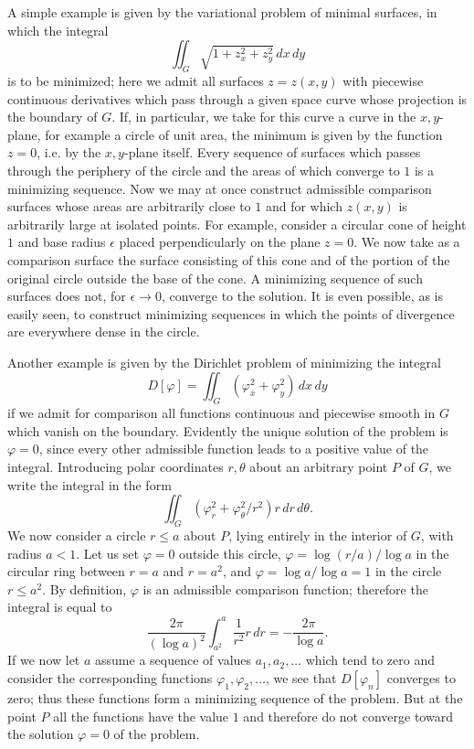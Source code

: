 A simple example is given by the variational problem of minimal surfaces, in which the integral
\[
\iint_G\sqrt{1+z_x^2+z_y^2}\,dx\,dy
\]
is to be minimized; here we admit all surfaces $z=z(x,y)$ with piecewise continuous derivatives which pass through a given space curve whose projection is the boundary of $G$. If, in particular, we take for this curve a curve in the $x,y$-plane, for example a circle of unit area, the minimum is given by the function $z=0$, i.e. by the $x,y$-plane itself. Every sequence of surfaces which passes through the periphery of the circle and the areas of which converge to $1$ is a minimizing sequence. Now we may at once construct admissible comparison surfaces whose areas are arbitrarily close to $1$ and for which $z(x,y)$ is arbitrarily large at isolated points. For example, consider a circular cone of height $1$ and base radius $\epsilon$ placed perpendicularly on the plane $z=0$. We now take as a comparison surface the surface consisting of this cone and of the portion of the original circle outside the base of the cone. A minimizing sequence of such surfaces does not, for $\epsilon\to0$, converge to the solution. It is even possible, as is easily seen, to construct minimizing sequences in which the points of divergence are everywhere dense in the circle.

Another example is given by the Dirichlet problem of minimizing the integral
\[
D[\varphi]=\iint_G(\varphi_x^2+\varphi_y^2)\,dx\,dy
\]
if we admit for comparison all functions continuous and piecewise smooth in $G$ which vanish on the boundary. Evidently the unique solution of the problem is $\varphi=0$, since every other admissible function leads to a positive value of the integral. Introducing polar coordinates $r,\theta$ about an arbitrary point $P$ of $G$, we write the integral in the form
\[
\iint_G(\varphi_r^2+\varphi_\theta^2/r^2)r\,dr\,d\theta.
\]
We now consider a circle $r\le a$ about $P$, lying entirely in the interior of $G$, with radius $a<1$. Let us set $\varphi=0$ outside this circle, $\varphi=\log(r/a)/\log a$ in the circular ring between $r=a$ and $r=a^2$, and $\varphi=\log a/\log a=1$ in the circle $r\le a^2$. By definition, $\varphi$ is an admissible comparison function; therefore the integral is equal to
\[
\frac{2\pi}{(\log a)^2}\int_{a^2}^{a}\frac{1}{r^2}r\,dr
=-\frac{2\pi}{\log a}.
\]
If we now let $a$ assume a sequence of values $a_1,a_2,\ldots$ which tend to zero and consider the corresponding functions $\varphi_1,\varphi_2,\ldots$, we see that $D[\varphi_n]$ converges to zero; thus these functions form a minimizing sequence of the problem. But at the point $P$ all the functions have the value $1$ and therefore do not converge toward the solution $\varphi=0$ of the problem.

